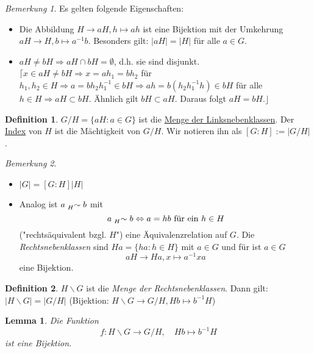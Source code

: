 \documentclass[12pt]{scrartcl} %
\newtheorem{lemma}{Lemma}
\theoremstyle{definition}
\newtheorem*{defn}{Definition}
\theoremstyle{remark}
\newtheorem*{nb}{Bemerkung}
\newcommand{\defi}{\underline}
\begin{document}
\begin{nb}
	Es gelten folgende Eigenschaften: 
	\begin{itemize}
	\item Die Abbildung $H \to aH, h \mapsto ah$ ist eine Bijektion mit der Umkehrung $aH \to H, b \mapsto a^{-1}b$.
		Besonders gilt: $\vert aH \vert = \vert H \vert$ für alle $a \in G$.
	\item $aH \neq bH \Rightarrow aH \cap bH = \emptyset$, d.h. sie sind disjunkt. \newline $\lceil x \in aH \neq bH \Rightarrow x = ah_{1} = bh_{2}$ für $h_{1},h_{2} \in H \Rightarrow a=bh_{2}h_{1}^{-1} \in bH \Rightarrow ah= b(h_{2}h_{1}^{-1}h) \in bH$ für alle $h \in H \Rightarrow aH \subset bH$. Ähnlich gilt $bH \subset aH$.
		Daraus folgt $aH=bH.\rfloor$ %
	\end{itemize}
\end{nb}

\begin{defn}
	$G/H = \lbrace aH : a \in G \rbrace$ ist die \defi{Menge der Linksnebenklassen}.
	Der \defi{Index} von $H$ ist die Mächtigkeit von $G/H$.
	Wir notieren ihn als \([G:H] := |G/H|\).
\end{defn}

\begin{nb}
	\begin{itemize}
 	\item $\vert G \vert = [G:H]\vert H\vert$
 	\item Analog ist $a \mathrel{\prescript{}{H}{\sim}} b$ mit \[a \mathrel{\prescript{}{H}{\sim}} b \Leftrightarrow \text{\(a=hb\) für ein \(h \in H\)}\] ("rechtsäquivalent bzgl. \(H\)") eine Äquivalenzrelation auf \(G\).
		Die \emph{Rechtsnebenklassen} sind $Ha=\lbrace ha : h \in H\rbrace$ mit $a \in G$ und für ist $a \in G$ \[aH \rightarrow Ha, x \mapsto a^{-1}xa\] eine Bijektion.
	\end{itemize}
\end{nb}

\begin{defn}
	$H \backslash G$ ist die \emph{Menge der Rechtsnebenklassen}. Dann gilt: $\vert H \backslash G \vert = \vert G/H \vert$
	(Bijektion: $H \backslash G \rightarrow G/H, Hb \mapsto b^{-1}H$)
\end{defn}

\begin{lemma} 
	Die Funktion $$f: H\backslash G \to G/H, \quad Hb \mapsto b^{-1}H$$ ist eine Bijektion.
\end{lemma}
\end{document}
